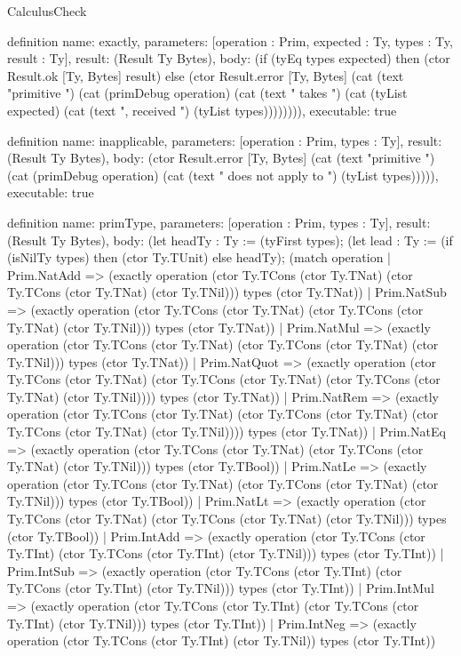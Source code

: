 \begin{lexlean}{CalculusCheck}
\begin{semanticmodule}
definition{
  name: exactly,
  parameters: [operation : Prim, expected : Ty, types : Ty, result : Ty],
  result: (Result Ty Bytes),
  body: (if (tyEq types expected) then (ctor Result.ok [Ty, Bytes] result) else (ctor Result.error [Ty, Bytes] (cat (text "primitive ") (cat (primDebug operation) (cat (text " takes ") (cat (tyList expected) (cat (text ", received ") (tyList types)))))))),
  executable: true
}

definition{
  name: inapplicable,
  parameters: [operation : Prim, types : Ty],
  result: (Result Ty Bytes),
  body: (ctor Result.error [Ty, Bytes] (cat (text "primitive ") (cat (primDebug operation) (cat (text " does not apply to ") (tyList types))))),
  executable: true
}

definition{
  name: primType,
  parameters: [operation : Prim, types : Ty],
  result: (Result Ty Bytes),
  body: (let headTy : Ty := (tyFirst types); (let lead : Ty := (if (isNilTy types) then (ctor Ty.TUnit) else headTy); (match operation
    | Prim.NatAdd => (exactly operation (ctor Ty.TCons (ctor Ty.TNat) (ctor Ty.TCons (ctor Ty.TNat) (ctor Ty.TNil))) types (ctor Ty.TNat))
    | Prim.NatSub => (exactly operation (ctor Ty.TCons (ctor Ty.TNat) (ctor Ty.TCons (ctor Ty.TNat) (ctor Ty.TNil))) types (ctor Ty.TNat))
    | Prim.NatMul => (exactly operation (ctor Ty.TCons (ctor Ty.TNat) (ctor Ty.TCons (ctor Ty.TNat) (ctor Ty.TNil))) types (ctor Ty.TNat))
    | Prim.NatQuot => (exactly operation (ctor Ty.TCons (ctor Ty.TNat) (ctor Ty.TCons (ctor Ty.TNat) (ctor Ty.TCons (ctor Ty.TNat) (ctor Ty.TNil)))) types (ctor Ty.TNat))
    | Prim.NatRem => (exactly operation (ctor Ty.TCons (ctor Ty.TNat) (ctor Ty.TCons (ctor Ty.TNat) (ctor Ty.TCons (ctor Ty.TNat) (ctor Ty.TNil)))) types (ctor Ty.TNat))
    | Prim.NatEq => (exactly operation (ctor Ty.TCons (ctor Ty.TNat) (ctor Ty.TCons (ctor Ty.TNat) (ctor Ty.TNil))) types (ctor Ty.TBool))
    | Prim.NatLe => (exactly operation (ctor Ty.TCons (ctor Ty.TNat) (ctor Ty.TCons (ctor Ty.TNat) (ctor Ty.TNil))) types (ctor Ty.TBool))
    | Prim.NatLt => (exactly operation (ctor Ty.TCons (ctor Ty.TNat) (ctor Ty.TCons (ctor Ty.TNat) (ctor Ty.TNil))) types (ctor Ty.TBool))
    | Prim.IntAdd => (exactly operation (ctor Ty.TCons (ctor Ty.TInt) (ctor Ty.TCons (ctor Ty.TInt) (ctor Ty.TNil))) types (ctor Ty.TInt))
    | Prim.IntSub => (exactly operation (ctor Ty.TCons (ctor Ty.TInt) (ctor Ty.TCons (ctor Ty.TInt) (ctor Ty.TNil))) types (ctor Ty.TInt))
    | Prim.IntMul => (exactly operation (ctor Ty.TCons (ctor Ty.TInt) (ctor Ty.TCons (ctor Ty.TInt) (ctor Ty.TNil))) types (ctor Ty.TInt))
    | Prim.IntNeg => (exactly operation (ctor Ty.TCons (ctor Ty.TInt) (ctor Ty.TNil)) types (ctor Ty.TInt))
}
\end{semanticmodule}
\end{lexlean}
